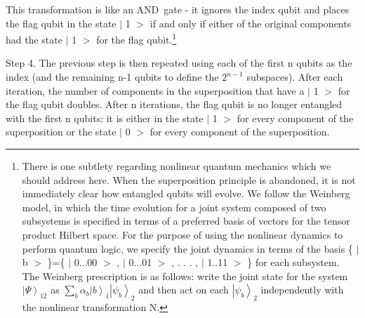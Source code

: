 \documentclass{article}
\begin{document}
This transformation is like an AND\ gate - it ignores the index qubit and
places the flag qubit in the state
$\vert$%
1%
$>$%
if and only if either of the original components had the state
$\vert$%
1%
$>$%
for the flag qubit.\footnote{There is one subtlety regarding nonlinear quantum
mechanics which we should address here. When the superposition principle is
abandoned, it is not immediately clear how entangled qubits will evolve. We
follow the Weinberg model, in which the time evolution for a joint system
composed of two subsystems is specified in terms of a preferred basis of
vectors for the tensor product Hilbert space. For the purpose of using the
nonlinear dynamics to perform quantum logic, we specify the joint dynamics in
terms of the basis \{%
$\vert$%
b%
$>$%
\}=\{%
$\vert$%
0...00%
$>$%
,
$\vert$%
0...01%
$>$%
, . . . ,
$\vert$%
1..11%
$>$%
\} for each subsystem. The Weinberg prescription is as follows: write the
joint state for the system $\left|  \Psi\right\rangle _{12}$ as $\sum
\limits_{b}\alpha_{b}\left|  b\right\rangle _{1}\left|  \psi_{b}\right\rangle
_{2}$ and then act on each $\left|  \psi_{b}\right\rangle _{2}$ independently
with the nonlinear transformation N.}

Step 4. The previous step is then repeated using each of the first n qubits as
the index (and the remaining n-1 qubits to define the $2^{n-1}$ subspaces).
After each iteration, the number of components in the superposition that have
a
$\vert$%
1%
$>$%
for the flag qubit doubles. After n iterations, the flag qubit is no longer
entangled with the first n qubits: it is either in the state
$\vert$%
1%
$>$%
for every component of the superposition or the state
$\vert$%
0%
$>$%
for every component of the superposition.
\end{document}

